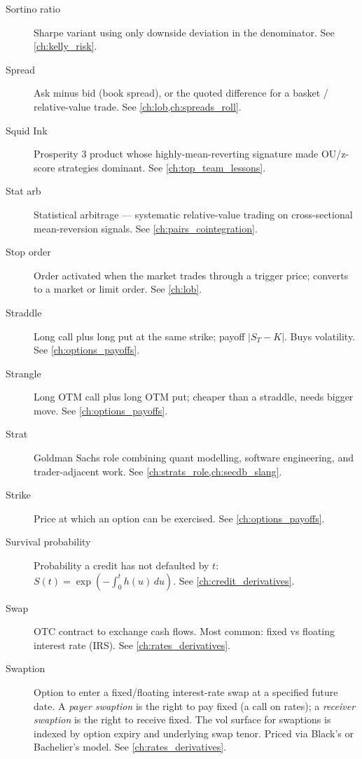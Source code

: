 \begin{description}
\item[Sortino ratio]
Sharpe variant using only downside deviation in the denominator. See \cref{ch:kelly_risk}.

\item[Spread]
Ask minus bid (book spread), or the quoted difference for a basket /
relative-value trade. See \cref{ch:lob,ch:spreads_roll}.

\item[Squid Ink]
Prosperity 3 product whose highly-mean-reverting signature made OU/z-score
strategies dominant. See \cref{ch:top_team_lessons}.

\item[Stat arb]
Statistical arbitrage --- systematic relative-value trading on
cross-sectional mean-reversion signals. See \cref{ch:pairs_cointegration}.

\item[Stop order]
Order activated when the market trades through a trigger price;
converts to a market or limit order. See \cref{ch:lob}.

\item[Straddle]
Long call plus long put at the same strike; payoff $|S_T - K|$. Buys
volatility. See \cref{ch:options_payoffs}.

\item[Strangle]
Long OTM call plus long OTM put; cheaper than a straddle, needs bigger
move. See \cref{ch:options_payoffs}.

\item[Strat]
Goldman Sachs role combining quant modelling, software engineering,
and trader-adjacent work. See \cref{ch:strats_role,ch:secdb_slang}.

\item[Strike]
Price at which an option can be exercised. See \cref{ch:options_payoffs}.

\item[Survival probability]
Probability a credit has not defaulted by $t$: $S(t) =
\exp(-\int_0^t h(u)\,du)$. See \cref{ch:credit_derivatives}.

\item[Swap]
OTC contract to exchange cash flows. Most common: fixed vs floating
interest rate (IRS). See \cref{ch:rates_derivatives}.

\item[Swaption]
Option to enter a fixed/floating interest-rate swap at a specified
future date. A \emph{payer swaption} is the right to pay fixed (a call
on rates); a \emph{receiver swaption} is the right to receive fixed.
The vol surface for swaptions is indexed by option expiry and
underlying swap tenor. Priced via Black's or Bachelier's model.
See \cref{ch:rates_derivatives}.


\end{description}
